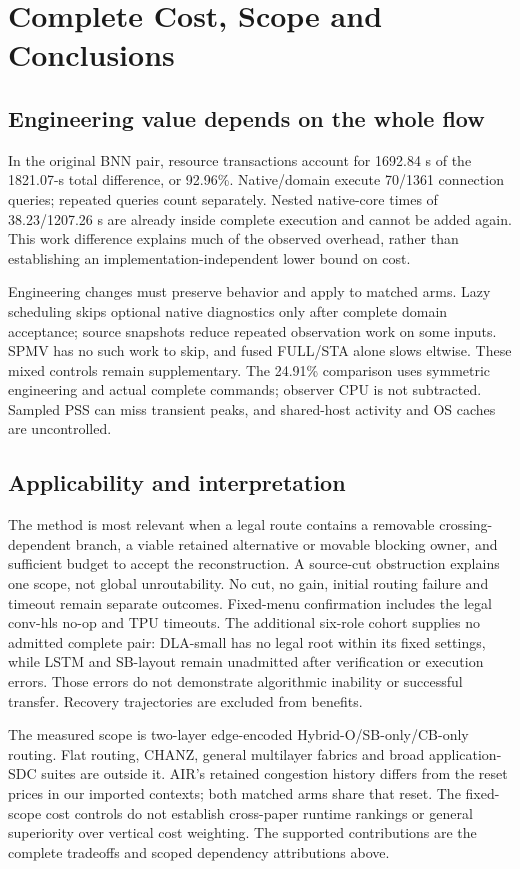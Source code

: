 \documentclass[conference,10pt]{IEEEtran}
\begin{document}
\section{Complete Cost, Scope and Conclusions}
\subsection{Engineering value depends on the whole flow}
In the original BNN pair, resource transactions account for 1692.84 s of the 1821.07-s total difference, or 92.96\%. Native/domain execute 70/1361 connection queries; repeated queries count separately. Nested native-core times of 38.23/1207.26 s are already inside complete execution and cannot be added again. This work difference explains much of the observed overhead, rather than establishing an implementation-independent lower bound on cost.

Engineering changes must preserve behavior and apply to matched arms. Lazy scheduling skips optional native diagnostics only after complete domain acceptance; source snapshots reduce repeated observation work on some inputs. SPMV has no such work to skip, and fused FULL/STA alone slows eltwise. These mixed controls remain supplementary. The 24.91\% comparison uses symmetric engineering and actual complete commands; observer CPU is not subtracted. Sampled PSS can miss transient peaks, and shared-host activity and OS caches are uncontrolled.

\subsection{Applicability and interpretation}
The method is most relevant when a legal route contains a removable crossing-dependent branch, a viable retained alternative or movable blocking owner, and sufficient budget to accept the reconstruction. A source-cut obstruction explains one scope, not global unroutability. No cut, no gain, initial routing failure and timeout remain separate outcomes. Fixed-menu confirmation includes the legal conv-hls no-op and TPU timeouts. The additional six-role cohort supplies no admitted complete pair: DLA-small has no legal root within its fixed settings, while LSTM and SB-layout remain unadmitted after verification or execution errors. Those errors do not demonstrate algorithmic inability or successful transfer. Recovery trajectories are excluded from benefits.

The measured scope is two-layer edge-encoded Hybrid-O/SB-only/CB-only routing. Flat routing, CHANZ, general multilayer fabrics and broad application-SDC suites are outside it. AIR's retained congestion history differs from the reset prices in our imported contexts; both matched arms share that reset. The fixed-scope cost controls do not establish cross-paper runtime rankings or general superiority over vertical cost weighting. The supported contributions are the complete tradeoffs and scoped dependency attributions above.
\end{document}
